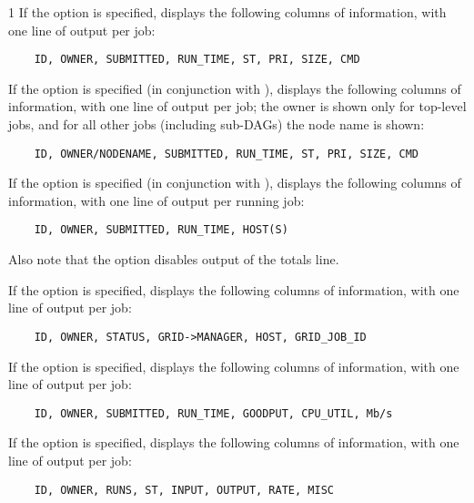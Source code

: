 \begin{ManPage}{\label{man-condor-q}}{1}
If the  option is specified,  displays the
following columns of information, with one line of output
per job:
\begin{verbatim}
    ID, OWNER, SUBMITTED, RUN_TIME, ST, PRI, SIZE, CMD
\end{verbatim}

If the  option is specified (in conjunction with ),
 displays the following columns of information, with one line
of output per job; the owner is shown only for top-level jobs, and for
all other jobs (including sub-DAGs) the node name is shown:
\begin{verbatim}
    ID, OWNER/NODENAME, SUBMITTED, RUN_TIME, ST, PRI, SIZE, CMD
\end{verbatim}

If the  option is specified (in conjunction with ),
 displays the following columns of information, with one line
of output per running job:
\begin{verbatim}
    ID, OWNER, SUBMITTED, RUN_TIME, HOST(S)
\end{verbatim}
Also note that the  option disables output of the
totals line.


If the  option is specified,  displays the
following columns of information, with one line of output per job:
\begin{verbatim}
    ID, OWNER, STATUS, GRID->MANAGER, HOST, GRID_JOB_ID
\end{verbatim}

If the  option is specified,  displays the
following columns of information, with one line of output per job:
\begin{verbatim}
    ID, OWNER, SUBMITTED, RUN_TIME, GOODPUT, CPU_UTIL, Mb/s
\end{verbatim}

If the  option is specified,  displays the
following columns of information, with one line of output per job:
\begin{verbatim}
    ID, OWNER, RUNS, ST, INPUT, OUTPUT, RATE, MISC
\end{verbatim}


\end{ManPage}
